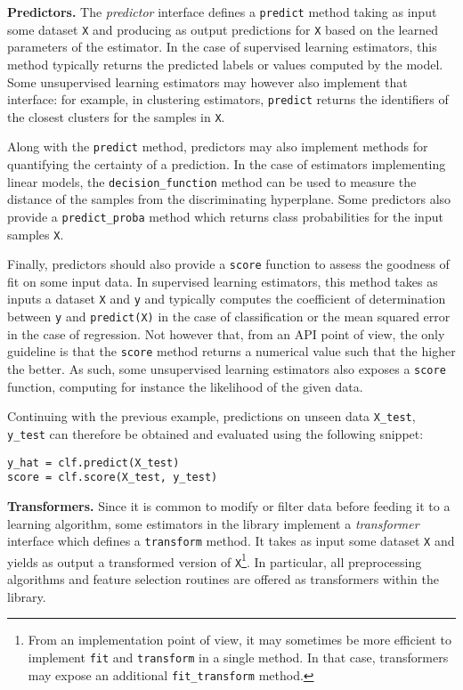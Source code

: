 \documentclass{llncs}
\begin{document}
\textbf{Predictors.} The \textit{predictor} interface defines a \texttt{predict}
method taking as input some dataset \texttt{X} and producing as output
predictions for \texttt{X} based on the learned parameters of the estimator. In
the case of supervised learning estimators, this method typically returns the
predicted labels or values computed by the model. Some unsupervised learning
estimators may however also implement that interface: for example, in clustering
estimators, \texttt{predict} returns the identifiers of the closest clusters for
the samples in \texttt{X}.

Along with the \texttt{predict} method, predictors may also implement methods
for quantifying the certainty of a prediction. In the case of estimators
implementing linear models, the \texttt{decision\_function} method can be used
to measure the distance of the samples from the discriminating hyperplane. Some
predictors also provide a \texttt{predict\_proba} method which returns
class probabilities for the input samples \texttt{X}.

Finally, predictors should also provide a \texttt{score} function to assess the
goodness of fit on some input data. In supervised learning estimators, this
method takes as inputs a dataset \texttt{X} and \texttt{y} and typically
computes the coefficient of determination between \texttt{y} and
\texttt{predict(X)} in the case of classification or the mean squared error in
the case of regression. Not however that, from an API point of view, the only
guideline is that the \texttt{score} method returns a numerical value such that
the higher the better. As such, some unsupervised learning estimators also
exposes a \texttt{score} function, computing for instance the likelihood of the
given data.

Continuing with the previous example, predictions on unseen data
\texttt{X\_test}, \texttt{y\_test} can therefore be obtained and evaluated using
the following snippet:
\begin{center}
\texttt{y\_hat = clf.predict(X\_test)}\\
\texttt{score = clf.score(X\_test, y\_test)}
\end{center}

\textbf{Transformers.} Since it is common to modify or filter data before
feeding it to a learning algorithm, some estimators in the library implement a
\textit{transformer} interface which defines a \texttt{transform} method. It
takes as input some dataset \texttt{X} and yields as output a transformed
version of \texttt{X}\footnote{From an implementation point of view, it may
sometimes be more efficient to implement \texttt{fit} and \texttt{transform} in
a single method. In that case, transformers may expose an additional
\texttt{fit\_transform} method.}. In particular, all preprocessing algorithms
and feature selection routines are offered as transformers within the library.
\end{document}
